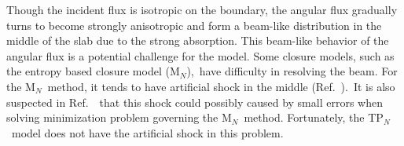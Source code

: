 \documentclass[review]{elsarticle}
\newcommand{\pn}{P$_N$}
\begin{document}
Though the incident flux is isotropic on the boundary, the angular flux gradually turns to become strongly anisotropic and form a beam-like distribution in the middle of the slab due to the strong absorption. This beam-like behavior of the angular flux is a potential challenge for the model. Some closure models, such as the entropy based closure model (M$_N$),~have difficulty in resolving the beam. For the M$_N$~method, it tends to have artificial shock in the middle (Ref.~\cite{coryentropy,brunnerentropy}).~It is also suspected in Ref.~\cite{coryentropy}~that this shock could possibly caused by small errors when solving minimization problem governing the M$_N$~method. Fortunately, the TP$_{N}$~model does not have the artificial shock in this problem.
%
%



\end{document}
